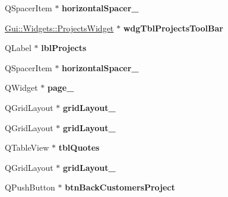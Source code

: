 \begin{DoxyCompactItemize}
\item 
\hypertarget{classUi__MainWindow_a4fc05b11984637298795a354792c4023}{Q\-Spacer\-Item $\ast$ {\bfseries horizontal\-Spacer\-\_}}\label{classUi__MainWindow_a4fc05b11984637298795a354792c4023}

\item 
\hypertarget{classUi__MainWindow_a82eb35c0d6fbf3af07a103786a46dcb5}{\hyperlink{classGui_1_1Widgets_1_1ProjectsWidget}{Gui\-::\-Widgets\-::\-Projects\-Widget} $\ast$ {\bfseries wdg\-Tbl\-Projects\-Tool\-Bar}}\label{classUi__MainWindow_a82eb35c0d6fbf3af07a103786a46dcb5}

\item 
\hypertarget{classUi__MainWindow_a9382d553307d18baa5353cbce1099e43}{Q\-Label $\ast$ {\bfseries lbl\-Projects}}\label{classUi__MainWindow_a9382d553307d18baa5353cbce1099e43}

\item 
\hypertarget{classUi__MainWindow_a9a022556cf8ce3fa47e51d79cb222ab0}{Q\-Spacer\-Item $\ast$ {\bfseries horizontal\-Spacer\-\_}}\label{classUi__MainWindow_a9a022556cf8ce3fa47e51d79cb222ab0}

\item 
\hypertarget{classUi__MainWindow_ac682cb2a9b686ca7c3d29771ad9ccb48}{Q\-Widget $\ast$ {\bfseries page\-\_}}\label{classUi__MainWindow_ac682cb2a9b686ca7c3d29771ad9ccb48}

\item 
\hypertarget{classUi__MainWindow_a79b264e6945e3b94a511427b1c270dd7}{Q\-Grid\-Layout $\ast$ {\bfseries grid\-Layout\-\_}}\label{classUi__MainWindow_a79b264e6945e3b94a511427b1c270dd7}

\item 
\hypertarget{classUi__MainWindow_a20728ed83bf740332bd908ea3e15ace6}{Q\-Grid\-Layout $\ast$ {\bfseries grid\-Layout\-\_}}\label{classUi__MainWindow_a20728ed83bf740332bd908ea3e15ace6}

\item 
\hypertarget{classUi__MainWindow_a649f86608763433edeed5c60d7015b3f}{Q\-Table\-View $\ast$ {\bfseries tbl\-Quotes}}\label{classUi__MainWindow_a649f86608763433edeed5c60d7015b3f}

\item 
\hypertarget{classUi__MainWindow_aa03590dd5aac614bf717649a544c015f}{Q\-Grid\-Layout $\ast$ {\bfseries grid\-Layout\-\_}}\label{classUi__MainWindow_aa03590dd5aac614bf717649a544c015f}

\item 
\hypertarget{classUi__MainWindow_a49cb2b35f0c4f5e5981ce4621c741714}{Q\-Push\-Button $\ast$ {\bfseries btn\-Back\-Customers\-Project}}\label{classUi__MainWindow_a49cb2b35f0c4f5e5981ce4621c741714}


\end{DoxyCompactItemize}
